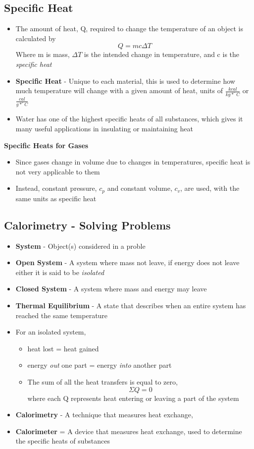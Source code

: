 \subsection{Specific Heat}
\begin{itemize}
    \item The amount of heat, Q, required to change the temperature of an object is calculated by \[Q=mc\Delta T\] Where m is mass, \(\Delta T\) is the intended change in temperature, and c is the \emph{specific heat}
    \item \textbf{Specific Heat} - Unique to each material, this is used to determine how much temperature will change with a given amount of heat, units of \(\frac{kcal}{kg*^\circ C}\) or \(\frac{cal}{g*^\circ C}\)
    \item Water has one of the highest specific heats of all substances, which gives it many useful applications in insulating or maintaining heat
\end{itemize}

\textbf{Specific Heats for Gases}
\begin{itemize}
    \item Since gases change in volume due to changes in temperatures, specific heat is not very applicable to them
    \item Instead, constant pressure, \(c_p\) and constant volume, \(c_v\), are used, with the same units as specific heat
\end{itemize}

\subsection{Calorimetry - Solving Problems}
\begin{itemize}
    \item \textbf{System} - Object(s) considered in a proble
    \item \textbf{Open System} - A system where mass not leave, if energy does not leave either it is said to be \emph{isolated}
    \item \textbf{Closed System} - A system where mass and energy may leave
    \item \textbf{Thermal Equilibrium} - A state that describes when an entire system has reached the same temperature
    \item For an isolated system, 
    \begin{itemize}
        \item heat lost = heat gained
        \item energy \emph{out} one part = energy \emph{into} another part
        \item The sum of all the heat transfers is equal to zero, \[\Sigma Q=0\] where each Q represents heat entering or leaving a part of the system
    \end{itemize}
    \item \textbf{Calorimetry} - A technique that measures heat exchange, 
    \item\textbf{Calorimeter} = A device that measures heat exchange, used to determine the specific heats of substances
\end{itemize}

